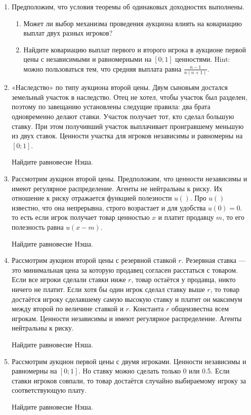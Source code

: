 

\begin{enumerate}
\item Предположим, что условия теоремы об одинаковых доходностях выполнены.
\begin{enumerate}
\item Может ли выбор механизма проведения аукциона влиять на ковариацию выплат двух разных игроков?
\item  Найдите ковариацию выплат первого и второго игрока в аукционе первой цены с независимыми и равномерными на $ [0;1] $ ценностями. Hint: можно пользоваться тем, что средняя выплата равна $ \frac{n-1}{n(n+1)} $.
\end{enumerate}


\item «Наследство» по типу аукциона второй цены. Двум сыновьям достался земельный участок в наследство. Отец не хотел, чтобы участок был разделен, поэтому по завещанию установлены следущие правила: два брата одновременно делают ставки. Участок получает тот, кто сделал большую ставку. При этом получивший участок выплачивает проигравшему меньшую из двух ставок. Ценности участка для игроков независимы и равномерны на $ [0;1] $.

Найдите равновесие Нэша.


\item Рассмотрим аукцион второй цены. Предположим, что ценности независимы и имеют регулярное распределение. Агенты не нейтральны к риску. Их отношение к риску отражается функцией полезности $ u() $. Про $ u() $ известно, что она непрерывна, строго возрастает и для удобства $ u(0)=0 $. то есть если игрок получает товар ценностью $ x $ и платит продавцу $ m $, то его полезность равна $ u(x-m) $.

Найдите равновесие Нэша.



\item Рассмотрим аукцион второй цены с резервной ставкой $ r $. Резервная ставка — это минимальная цена за которую продавец согласен расстаться с товаром. Если все игроки сделали ставки ниже $ r $, товар остаётся у продавца, никто ничего не платит. Если хотя бы один игрок сделал ставку выше $ r $, то товар достаётся игроку сделавшему самую высокую ставку и платит он максимум между второй по величине ставкой и $ r $. Константа $ r $ общеизвестна всем игрокам. Ценности независимы и имеют регулярное распределение. Агенты нейтральны к риску.

Найдите равновесие Нэша.


\item Рассмотрим аукцион первой цены с двумя игроками. Ценности независимы и равномерны на $ [0;1] $. Но ставку можно сделать только 0 или 0.5. Если ставки игроков совпали, то товар достаётся случайно выбираемому игроку за соответствующую плату.

Найдите равновесие Нэша.

\end{enumerate}
